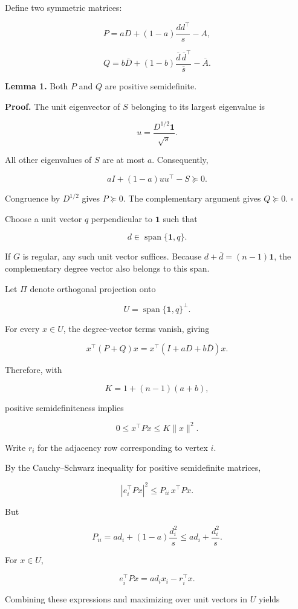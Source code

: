 \documentclass[11pt]{article}
\begin{document}
Define two symmetric matrices:

\[
P=aD+(1-a)\frac{dd^\top}{s}-A,
\]

\[
Q=b\overline D+
(1-b)\frac{\overline d\,\overline d^\top}{\overline s}
-\overline A.
\]

\textbf{Lemma 1.} Both \(P\) and \(Q\) are positive semidefinite.

\textbf{Proof.} The unit eigenvector of \(S\) belonging to its largest eigenvalue is

\[
u=\frac{D^{1/2}\mathbf1}{\sqrt s}.
\]

All other eigenvalues of \(S\) are at most \(a\). Consequently,

\[
aI+(1-a)uu^\top-S\succeq0.
\]

Congruence by \(D^{1/2}\) gives \(P\succeq0\). The complementary argument gives \(Q\succeq0\). \(\square\)

Choose a unit vector \(q\) perpendicular to \(\mathbf1\) such that

\[
d\in\operatorname{span}\{\mathbf1,q\}.
\]

If \(G\) is regular, any such unit vector suffices. Because \(d+\overline d=(n-1)\mathbf1\), the complementary degree vector also belongs to this span.

Let \(\Pi\) denote orthogonal projection onto

\[
U=\operatorname{span}\{\mathbf1,q\}^{\perp}.
\]

For every \(x\in U\), the degree-vector terms vanish, giving

\[
x^\top(P+Q)x
=x^\top(I+aD+b\overline D)x.
\]

Therefore, with

\[
K=1+(n-1)(a+b),
\]

positive semidefiniteness implies

\[
0\leq x^\top Px\leq K\|x\|^2.
\tag{2}
\]

Write \(r_i\) for the adjacency row corresponding to vertex \(i\).

By the Cauchy--Schwarz inequality for positive semidefinite matrices,

\[
|e_i^\top Px|^2
\leq P_{ii}\,x^\top Px.
\]

But

\[
P_{ii}
=a d_i+(1-a)\frac{d_i^2}{s}
\leq a d_i+\frac{d_i^2}{s}.
\]

For \(x\in U\),

\[
e_i^\top Px=a d_i x_i-r_i^\top x.
\]

Combining these expressions and maximizing over unit vectors in \(U\) yields
\end{document}

